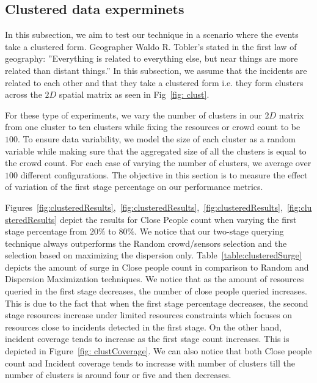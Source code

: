 \documentclass{acm_proc_article-sp}
\begin{document}
\subsection{Clustered data experminets}
In this subsection, we aim to test our technique in a scenario where the events take a clustered form. Geographer Waldo R. Tobler's stated in the first law of geography: ''Everything is related to everything else, but near things are more related than distant things.'' In this subsection, we assume that the incidents are related to each other and that they take a clustered form i.e. they form clusters across the $2D$ spatial matrix as seen in Fig~\ref{fig: clust}. \par
For these type of experiments, we vary the number of clusters in our $2D$ matrix from one cluster to ten clusters while fixing the resources or crowd count to be $100$. To ensure data variability, we model the size of each cluster as a random variable while making sure that the aggregated size of all the clusters is equal to the crowd count. For each case of varying the number of clusters, we average over $100$ different configurations. The objective in this section is to measure the effect of variation of the first stage percentage on our performance metrics.\par
Figures~\ref{fig:clusteredResults},~\ref{fig:clusteredResults},~\ref{fig:clusteredResults},~\ref{fig:clusteredResults} depict the results for Close People count when varying the first stage percentage from $20\%$ to $80\%$. We notice that our two-stage querying technique always outperforms the Random crowd/sensors selection and the selection based on maximizing the dispersion only. Table~\ref{table:clusteredSurge} depicts the amount of surge in Close people count in comparison to Random and Dispersion Maximization techniques. We notice that as the amount of resources queried in the first stage decreases, the number of close people queried increases. This is due to the fact that when the first stage percentage decreases, the second stage resources increase under limited resources constraints which focuses on resources close to incidents detected in the first stage. On the other hand, incident coverage tends to increase as the first stage count increases. This is depicted in Figure~\ref{fig: clustCoverage}. We can also notice that both Close people count and Incident coverage tends to increase with number of clusters till the number of clusters is around four or five and then decreases.
\end{document}
